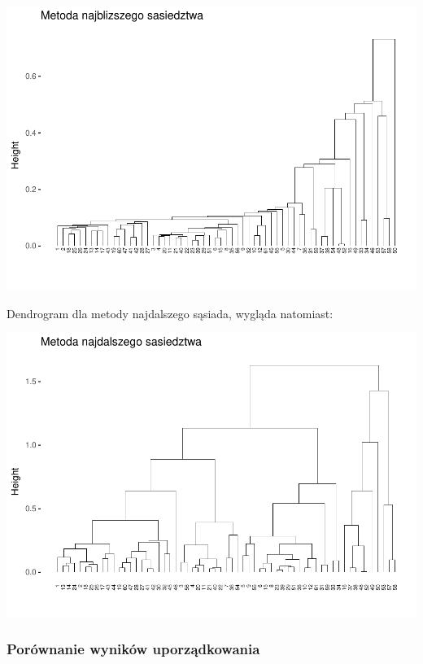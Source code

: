 \documentclass[12pt,a4paper]{report}
\begin{document}
{\includegraphics{Metoda_nieliniowa_duzy_files/figure-latex/unnamed-chunk-9-1.pdf}

Dendrogram dla metody najdalszego sąsiada, wygląda natomiast:

\begin{Shaded}
\begin{Highlighting}[]
\NormalTok{, }\NormalTok{, }
 \NormalTok{)}
\end{Highlighting}
\end{Shaded}

\includegraphics{Metoda_nieliniowa_duzy_files/figure-latex/unnamed-chunk-10-1.pdf}

\subsubsection{Porównanie wyników uporządkowania}

}
\end{document}
